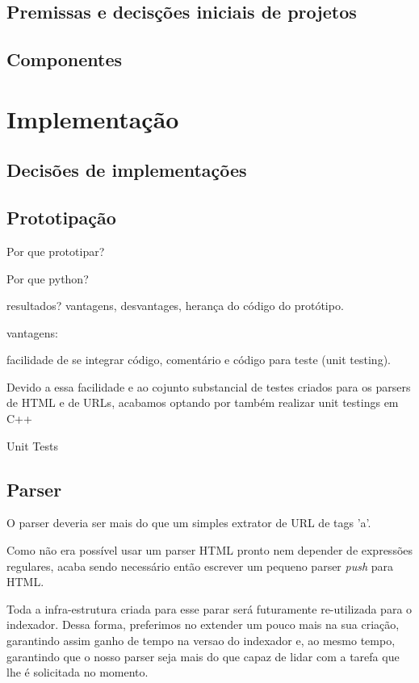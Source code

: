 \documentclass[10pt,twocolumn]{article}
\begin{document}
\subsection{Premissas e decisções iniciais de projetos}
\subsection{Componentes}

\section{Implementação}
\subsection{Decisões de implementações}
\subsection{Prototipação}

Por que prototipar?

Por que python?

resultados? vantagens, desvantages, herança do código do protótipo.

vantagens:

facilidade de se integrar código, comentário e código para teste (unit testing).

Devido a essa facilidade e ao cojunto substancial de testes criados para os
parsers de HTML e de URLs, acabamos optando por também realizar unit testings
em C++

Unit Tests

\subsection{Parser}

O parser deveria ser mais do que um simples extrator de URL de tags 'a'.

Como não era possível usar um parser HTML pronto nem depender de expressões
regulares, acaba sendo necessário então escrever um pequeno parser \emph{push}
para HTML.

Toda a infra-estrutura criada para esse parar será futuramente re-utilizada
para o indexador. Dessa forma, preferimos no extender um pouco mais na sua
criação, garantindo assim ganho de tempo na versao do indexador e, ao mesmo
tempo, garantindo que o nosso parser seja mais do que capaz de lidar com a
tarefa que lhe é solicitada no momento.
\end{document}
